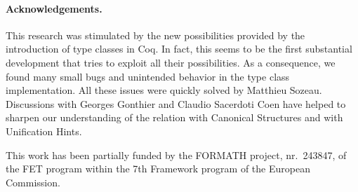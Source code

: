 \documentclass[a4paper,10pt,runningheads]{llncs}
\begin{document}
\paragraph{Acknowledgements.}
This research was stimulated by the new possibilities provided by the introduction of type classes
in Coq. In fact, this seems to be the first substantial development that tries to exploit all their
possibilities. As a consequence, we found many small bugs and unintended behavior in the type
class implementation. All these issues were quickly solved by Matthieu Sozeau. Discussions with
Georges Gonthier and Claudio Sacerdoti Coen have helped to
sharpen our understanding of the relation with Canonical Structures and with Unification Hints.


This work has been partially funded by the FORMATH project, nr.\ 243847, of the FET program within the 7th Framework program of the European Commission.


\end{document}
